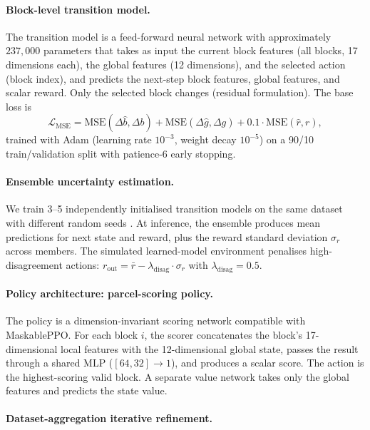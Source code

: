 \documentclass[11pt]{article}
\begin{document}
\paragraph{Block-level transition model.}

The transition model is a feed-forward neural network with approximately $237{,}000$ parameters that takes as input the current block features (all blocks, 17 dimensions each), the global features (12 dimensions), and the selected action (block index), and predicts the next-step block features, global features, and scalar reward. Only the selected block changes (residual formulation). The base loss is
\begin{equation}
\mathcal{L}_{\text{MSE}} = \mathrm{MSE}(\Delta\hat{b}, \Delta b) + \mathrm{MSE}(\Delta\hat{g}, \Delta g) + 0.1 \cdot \mathrm{MSE}(\hat{r}, r),
\end{equation}
trained with Adam (learning rate $10^{-3}$, weight decay $10^{-5}$) on a 90/10 train/validation split with patience-6 early stopping.

\paragraph{Ensemble uncertainty estimation.}

We train 3--5 independently initialised transition models on the same dataset with different random seeds \citep{lakshminarayanan2017simple}. At inference, the ensemble produces mean predictions for next state and reward, plus the reward standard deviation $\sigma_r$ across members. The simulated learned-model environment penalises high-disagreement actions: $r_{\text{out}} = \bar{r} - \lambda_{\text{disag}} \cdot \sigma_r$ with $\lambda_{\text{disag}} = 0.5$.

\paragraph{Policy architecture: parcel-scoring policy.}

The policy is a dimension-invariant scoring network compatible with MaskablePPO. For each block $i$, the scorer concatenates the block's 17-dimensional local features with the 12-dimensional global state, passes the result through a shared MLP ($[64, 32] \to 1$), and produces a scalar score. The action is the highest-scoring valid block. A separate value network takes only the global features and predicts the state value.

\paragraph{Dataset-aggregation iterative refinement.}
\end{document}
